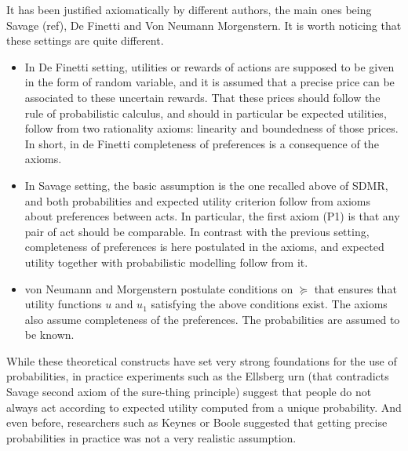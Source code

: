 \documentclass[french, english]{llncs}
\begin{document}
	It has been justified axiomatically by different authors, the main ones being Savage (ref), De Finetti and Von Neumann Morgenstern. It is worth noticing that these settings are quite different.
	\begin{itemize}
		\item In De Finetti setting, utilities or rewards of actions are supposed to be given in the form of random variable, and it is assumed that a precise price can be associated to these uncertain rewards. That these prices should follow the rule of probabilistic calculus, and should in particular be expected utilities, follow from two rationality axioms: linearity and boundedness of those prices. In short, in de Finetti completeness of preferences is a consequence of the axioms. 
		\item In Savage setting, the basic assumption is the one recalled above of SDMR, and both probabilities and expected utility criterion follow from axioms about preferences between acts. In particular, the first axiom (P1) is that any pair of act should be comparable. In contrast with the previous setting, completeness of preferences is here postulated in the axioms, and expected utility together with probabilistic modelling follow from it. 
		\item von Neumann and Morgenstern postulate conditions on $\succeq$ that ensures that utility functions $u$ and $u_1$ satisfying the above conditions exist. The axioms also assume completeness of the preferences. The probabilities are assumed to be known.
	\end{itemize}
	While these theoretical constructs have set very strong foundations for the use of probabilities, in practice experiments such as the Ellsberg urn (that contradicts Savage second axiom of the sure-thing principle) suggest that people do not always act according to expected utility computed from a unique probability. And even before, researchers such as Keynes or Boole suggested that getting precise probabilities in practice was not a very realistic assumption. 
	
\end{document}
